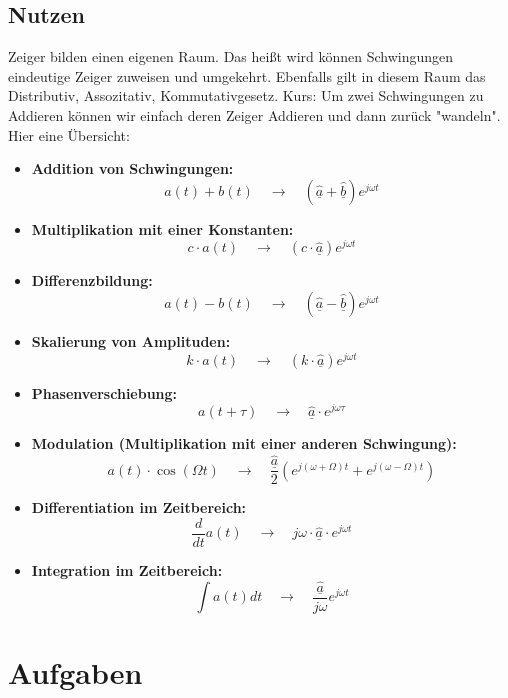 \documentclass[11pt,a4paper]{article}
\begin{document}
\subsection{Nutzen}
Zeiger bilden einen eigenen Raum. Das heißt wird können Schwingungen eindeutige Zeiger zuweisen und umgekehrt. Ebenfalls gilt in diesem Raum das Distributiv, Assozitativ, Kommutativgesetz. Kurs: Um zwei Schwingungen zu Addieren können wir einfach deren Zeiger Addieren und dann zurück "wandeln". Hier eine Übersicht:


\begin{itemize}
    \item \textbf{Addition von Schwingungen:} \quad 
    \[
    a(t) + b(t) \quad \rightarrow \quad (\hat{\underline{a}} + \hat{\underline{b}}) e^{j\omega t}
    \]

    \item \textbf{Multiplikation mit einer Konstanten:} \quad 
    \[
    c \cdot a(t) \quad \rightarrow \quad (c\cdot \hat{\underline{a}}) e^{j\omega t}
    \]

    \item \textbf{Differenzbildung:} \quad 
    \[
    a(t) - b(t) \quad \rightarrow \quad (\hat{\underline{a}} - \hat{\underline{b}}) e^{j\omega t}
    \]

    \item \textbf{Skalierung von Amplituden:} \quad 
    \[
    k \cdot a(t) \quad \rightarrow \quad (k\cdot \hat{\underline{a}}) e^{j\omega t}
    \]

    \item \textbf{Phasenverschiebung:} \quad 
    \[
    a(t + \tau) \quad \rightarrow \quad \hat{\underline{a}}\cdot e^{j\omega \tau}
    \]


\noindent
{}



    \item \textbf{Modulation (Multiplikation mit einer anderen Schwingung):} \quad 
    \[
    a(t) \cdot \cos(\Omega t) \quad \rightarrow \quad \frac{\hat{\underline{a}}}{2} \left( e^{j(\omega+\Omega)t} + e^{j(\omega-\Omega)t} \right)
    \]

    \item \textbf{Differentiation im Zeitbereich:} \quad 
    \[
    \frac{d}{dt} a(t) \quad \rightarrow \quad j\omega\cdot \hat{\underline{a}} \cdot e^{j\omega t}
    \]
 
    \item \textbf{Integration im Zeitbereich:} \quad 
    \[
    \int a(t) dt \quad \rightarrow \quad \frac{\hat{\underline{a}}}{j\omega} e^{j\omega t}
    \]
\end{itemize}

\newpage
\section{Aufgaben}
\end{document}
